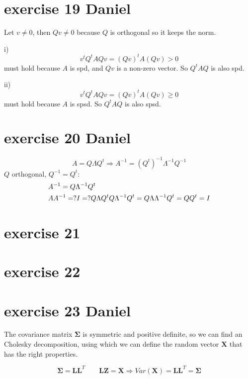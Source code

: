 \documentclass{article}
\let\normalSigma\Sigma
\renewcommand{\Sigma}{\bm{\normalSigma}} %
\begin{document}
\section{exercise 19 Daniel}
Let $v \neq0$, then $Qv \neq 0$ because $Q$ is orthogonal so it keeps the norm.

i) \[{v^t}{Q^t}AQv = {\left( {Qv} \right)^t}A\left( {Qv} \right) > 0\]
must hold because $A$ is spd, and $Qv$ is a non-zero vector. So $Q^tAQ$ is also spd.

ii) \[{v^t}{Q^t}AQv = {\left( {Qv} \right)^t}A\left( {Qv} \right) \geqslant 0\]
must hold because $A$ is spsd. So $Q^tAQ$ is also spsd.

\section{exercise 20 Daniel}
\[A = Q\Lambda {Q^t} \Rightarrow {A^{ - 1}} = {\left( {{Q^t}} \right)^{ - 1}}{\Lambda ^{ - 1}}{Q^{ - 1}}\]
$Q$ orthogonal, $Q^{-1} = Q^t$:
\[\begin{gathered}
        {A^{ - 1}} = Q{\Lambda ^{ - 1}}{Q^t} \hfill \\
        A{A^{ - 1}} = ?I = ?Q\Lambda {Q^t}Q{\Lambda ^{ - 1}}{Q^t} = Q\Lambda {\Lambda ^{ - 1}}{Q^t} = Q{Q^t} = I \hfill \\
    \end{gathered} \]
\section{exercise 21}

\section{exercise 22}
\section{exercise 23 Daniel}
The covariance matrix $\mathbf{\Sigma}$ is symmetric and positive definite,
so we can find an Cholesky decomposition,
using which we can define the random vector $\mathbf{X}$ that has the right properties.

\[{\mathbf{\Sigma }} = {\mathbf{L}}{{\mathbf{L}}^T}\qquad {\mathbf{LZ}} = {\mathbf{X}} \Rightarrow Var\left( {\mathbf{X}} \right) = {\mathbf{L}}{{\mathbf{L}}^T} = {\mathbf{\Sigma }}\]
\end{document}
